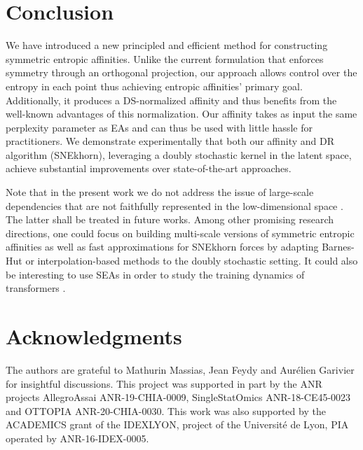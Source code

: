 
\section{Conclusion}\label{sec:conclusion}

We have introduced a new principled and efficient method for constructing symmetric entropic affinities. Unlike the current formulation that enforces symmetry through an orthogonal projection, our approach allows control over the entropy in each point thus achieving entropic affinities' primary goal. Additionally, it produces a DS-normalized affinity and thus benefits from the well-known advantages of this normalization. Our affinity takes as input the same perplexity parameter as EAs and can thus be used with little hassle for practitioners. We demonstrate experimentally that both our affinity and DR algorithm (SNEkhorn), leveraging a doubly stochastic kernel in the latent space, achieve substantial improvements over state-of-the-art approaches.

Note that in the present work we do not address the issue of large-scale dependencies that are not faithfully represented in the low-dimensional space \cite{van2022probabilistic}. The latter shall be treated in future works. 
Among other promising research directions, one could focus on building multi-scale versions of symmetric entropic affinities \cite{lee2015multi} as well as fast approximations for SNEkhorn forces by adapting \eg Barnes-Hut \cite{van2013barnes} or interpolation-based methods \cite{linderman2019fast} to the doubly stochastic setting. It could also be interesting to use SEAs in order to study the training dynamics of transformers \cite{zhai2023sigmareparam}.

\section*{Acknowledgments} 
The authors are grateful to Mathurin Massias, Jean Feydy and Aurélien Garivier for insightful discussions.
This project was supported in part by the ANR projects AllegroAssai ANR-19-CHIA-0009, SingleStatOmics ANR-18-CE45-0023 and OTTOPIA ANR-20-CHIA-0030. This work was also supported by the ACADEMICS grant of the IDEXLYON, project of the Université de Lyon, PIA operated by ANR-16-IDEX-0005.

